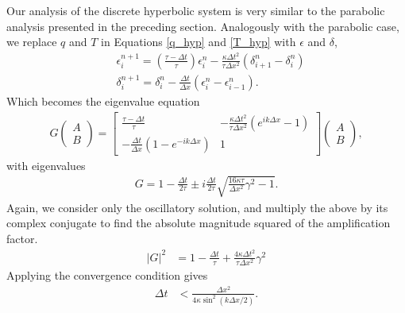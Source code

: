 \documentclass[iop]{emulateapj}
\begin{document}
				Our analysis of the discrete hyperbolic system is very similar to the parabolic analysis presented in the preceding section.
				Analogously with the parabolic case, we replace $q$ and $T$ in Equations \ref{q_hyp} and \ref{T_hyp} with $\epsilon$ and $\delta$,
				\begin{align}
					&\epsilon_i^{n+1} = \left( \frac{\tau - \Delta t}{\tau} \right) \epsilon_i^n - \frac{\kappa \Delta t^2}{\tau \Delta x^2} \left( \delta_{i+1}^n - \delta_i^n \right) \\
					&\delta_i^{n+1} = \delta_i^n - \frac{\Delta t}{\Delta x} \left( \epsilon_i^n - \epsilon_{i-1}^n \right).
				\end{align}
				Which becomes the eigenvalue equation
				\begin{align}
				G \begin{pmatrix}
				A \\
				B
				\end{pmatrix} = \begin{bmatrix}
				\frac{\tau - \Delta t}{\tau} & -\frac{\kappa \Delta t^2}{\tau \Delta x^2} \left( e^{i k \Delta x} - 1 \right) \\
				-\frac{\Delta t}{\Delta x} \left( 1 - e^{-i k \Delta x} \right) & 1
				\end{bmatrix}
				\begin{pmatrix}
				A \\
				B
				\end{pmatrix}, \label{hyp_mat}
				\end{align}
				with eigenvalues
				\begin{align}
					G = 1 - \frac{\Delta t}{2 \tau} \pm i \frac{\Delta t}{2 \tau} \sqrt{\frac{16 \kappa \tau}{\Delta x^2} \gamma^2 - 1}.
				\end{align}
				Again, we consider only the oscillatory solution, and multiply the above by its complex conjugate to find the absolute magnitude squared of the amplification factor.
				\begin{align}
					|G|^2 &= 1 - \frac{\Delta t}{\tau} + \frac{4 \kappa \Delta t^2}{\tau \Delta x^2} \gamma^2
				\end{align}
				Applying the convergence condition gives
				\begin{align}
					\Delta t &< \frac{\Delta x^2}{4 \kappa \sin^2(k \Delta x / 2)}.
				\end{align}
\end{document}
